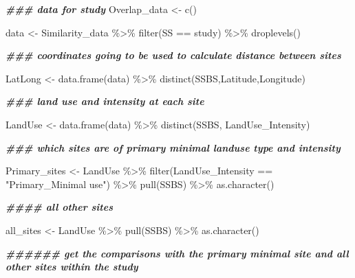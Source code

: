 \documentclass[
]{article}
\newenvironment{Shaded}{\begin{snugshade}}{\end{snugshade}}
\newcommand{\DocumentationTok}[1]{\textcolor[rgb]{0.56,0.35,0.01}{\textbf{\textit{#1}}}}
\newcommand{\FunctionTok}[1]{\textcolor[rgb]{0.00,0.00,0.00}{#1}}
\newcommand{\NormalTok}[1]{#1}
\newcommand{\OtherTok}[1]{\textcolor[rgb]{0.56,0.35,0.01}{#1}}
\newcommand{\SpecialCharTok}[1]{\textcolor[rgb]{0.00,0.00,0.00}{#1}}
\newcommand{\StringTok}[1]{\textcolor[rgb]{0.31,0.60,0.02}{#1}}
\begin{document}
\begin{Shaded}
\begin{Highlighting}[]
  \DocumentationTok{\#\#\# data for study }
\NormalTok{Overlap\_data }\OtherTok{\textless{}{-}} \FunctionTok{c}\NormalTok{()}



\NormalTok{  data }\OtherTok{\textless{}{-}}\NormalTok{ Similarity\_data }\SpecialCharTok{\%\textgreater{}\%} \FunctionTok{filter}\NormalTok{(SS }\SpecialCharTok{==}\NormalTok{ study) }\SpecialCharTok{\%\textgreater{}\%} \FunctionTok{droplevels}\NormalTok{()}
  
  \DocumentationTok{\#\#\# coordinates going to be used to calculate distance between sites}
   
\NormalTok{  LatLong }\OtherTok{\textless{}{-}} \FunctionTok{data.frame}\NormalTok{(data) }\SpecialCharTok{\%\textgreater{}\%} \FunctionTok{distinct}\NormalTok{(SSBS,Latitude,Longitude)}
  
  \DocumentationTok{\#\#\# land use and intensity at each site}
  
\NormalTok{  LandUse }\OtherTok{\textless{}{-}} \FunctionTok{data.frame}\NormalTok{(data) }\SpecialCharTok{\%\textgreater{}\%} \FunctionTok{distinct}\NormalTok{(SSBS, LandUse\_Intensity)}

  \DocumentationTok{\#\#\# which sites are of primary minimal landuse type and intensity  }
  
\NormalTok{  Primary\_sites }\OtherTok{\textless{}{-}}\NormalTok{ LandUse }\SpecialCharTok{\%\textgreater{}\%} \FunctionTok{filter}\NormalTok{(LandUse\_Intensity }\SpecialCharTok{==} \StringTok{"Primary\_Minimal use"}\NormalTok{) }\SpecialCharTok{\%\textgreater{}\%} \FunctionTok{pull}\NormalTok{(SSBS) }\SpecialCharTok{\%\textgreater{}\%} \FunctionTok{as.character}\NormalTok{()}
  
  \DocumentationTok{\#\#\#\# all other sites }
  
\NormalTok{  all\_sites }\OtherTok{\textless{}{-}}\NormalTok{ LandUse }\SpecialCharTok{\%\textgreater{}\%} \FunctionTok{pull}\NormalTok{(SSBS) }\SpecialCharTok{\%\textgreater{}\%} \FunctionTok{as.character}\NormalTok{()}

  

  
  \DocumentationTok{\#\#\#\#\#\# get the comparisons with the primary minimal site and all other sites within the study }
  

\end{Highlighting}
\end{Shaded}
\end{document}
